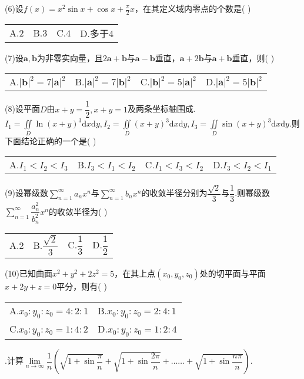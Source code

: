 \documentclass[UTF8]{ctexart}
\begin{document}
\noindent(6)设$ f(x)=x^2\sin{x}+\cos{x}+\frac{\pi}{2}x $，在其定义域内零点的个数是(	)\\
\begin{tabular}{llll}
	A.$ 2 $& B.$ 3 $& C.$ 4 $& D.多于4
\end{tabular}


\noindent(7)设$ \boldsymbol{a},\boldsymbol{b} $为非零实向量，且$ 2\boldsymbol{a}+\boldsymbol{b} $与$ \boldsymbol{a}-\boldsymbol{b} $垂直，$ \boldsymbol{a}+2\boldsymbol{b} $与$ \boldsymbol{a}+\boldsymbol{b} $垂直，则(	)\\
\begin{tabular}{llll}
	A.$ \left|\boldsymbol{b}\right|^2=7\left|\boldsymbol{a}\right|^2 $&
	B.$ \left|\boldsymbol{a}\right|^2=7\left|\boldsymbol{b}\right|^2 $&
	C.$ \left|\boldsymbol{b}\right|^2=5\left|\boldsymbol{a}\right|^2 $&
	D.$ \left|\boldsymbol{a}\right|^2=5\left|\boldsymbol{b}\right|^2 $
\end{tabular}

\thispagestyle{empty}


\noindent(8)设平面$ D $由$ x+y= \dfrac{1}{2},x+y=1 $及两条坐标轴围成.$ I_1=\underset{D}\iint\ln(x+y)^3\mathrm{d}x\mathrm{d}y,I_2=\underset{D}\iint(x+y)^3\mathrm{d}x\mathrm{d}y,I_3=\underset{D}\iint\sin(x+y)^3\mathrm{d}x\mathrm{d}y. $则下面结论正确的一个是(	)\\
\begin{tabular}{llll}
	A.$ I_1<I_2<I_3 $&
	B.$ I_3<I_1<I_2 $&
	C.$ I_1<I_3<I_2 $&
	D.$ I_3<I_2<I_1 $
\end{tabular}


\noindent(9)设幂级数$ \sum\limits_{n=1}^ \infty a_nx^n $与$ \sum\limits_{n=1}^{\infty}b_nx^n $的收敛半径分别为$ \dfrac{\sqrt{2}}{3} $与$ \dfrac{1}{3} $.则幂级数$ \sum\limits_{n=1}^{\infty}\dfrac{a_n^2}{b_n^2}x^n $的收敛半径为(	)\\
\begin{tabular}{llll}
	A.$ 2 $&
	B.$ \dfrac{\sqrt{2}}{3} $&
	C.$ \dfrac{1}{3} $&
	D.$ \dfrac{1}{2} $
\end{tabular}


\noindent(10)已知曲面$ x^2+y^2+2z^2=5 $，在其上点$ (x_0,y_0,z_0) $处的切平面与平面$ x+2y+z=0 $平分，则有(	)\\
\begin{tabular}{ll}
	A.$ x_0:y_0:z_0=4:2:1 $&
	B.$ x_0:y_0:z_0=2:4:1 $\\
	C.$ x_0:y_0:z_0=1:4:2 $&
	D.$ x_0:y_0:z_0=1:2:4 $
\end{tabular}


.计算$\underset{n\rightarrow\infty}{\lim}\dfrac{1}{n}\left(\sqrt{1+\sin\dfrac{\pi}{n}}+\sqrt{1+\sin\dfrac{2\pi}{n}}+\text{……}+\sqrt{1+\sin\dfrac{n\pi}{n}}\right)$.
\end{document}
